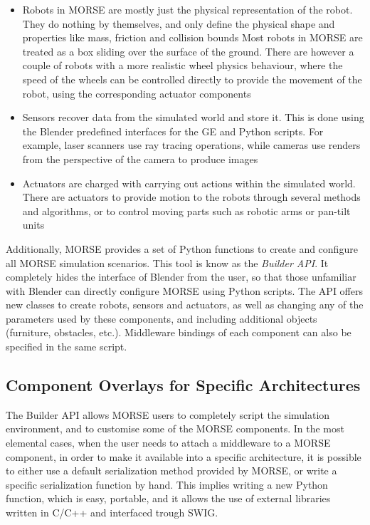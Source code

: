 \documentclass{llncs}
\begin{document}
\begin{itemize}
  \item Robots in MORSE are mostly just the physical representation of the
    robot. They do nothing by themselves, and only define the physical shape
    and properties like mass, friction and collision bounds Most robots in
    MORSE are treated as a box sliding over the surface of the ground. There
    are however a couple of robots with a more realistic wheel physics
    behaviour, where the speed of the wheels can be controlled directly to
    provide the movement of the robot, using the corresponding actuator
    components
  \item Sensors recover data from the simulated world and store it. This is
    done using the Blender predefined interfaces for the GE and Python scripts.
    For example, laser scanners use ray tracing operations, while cameras use
    renders from the perspective of the camera to produce images
  \item Actuators are charged with carrying out actions within the simulated
    world. There are actuators to provide motion to the robots through several
    methods and algorithms, or to control moving parts such as robotic arms or
    pan-tilt units
\end{itemize}

Additionally, MORSE provides a set of Python functions to create and
configure all MORSE simulation scenarios. This tool is know as the
\emph{Builder API}. It completely hides the interface of Blender from the user,
so that those unfamiliar with Blender can directly configure MORSE using Python
scripts. The API offers new classes to create robots, sensors and actuators, as
well as changing any of the parameters used by these components, and including
additional objects (furniture, obstacles, etc.). Middleware bindings of
each component can also be specified in the same script.


\subsection{Component Overlays for Specific Architectures}
\label{section:overlays}

The Builder API allows MORSE users to completely script the simulation
environment, and to customise some of the MORSE components.
In the most elemental cases, when the user needs to attach a middleware to a
MORSE component, in order to make it available into a specific architecture, it
is possible to either use a default serialization method provided by MORSE, or
write a specific serialization function by hand. This implies writing a new
Python function, which is easy, portable, and it allows the use of
external libraries written in C/C++ and interfaced trough SWIG.
\end{document}
